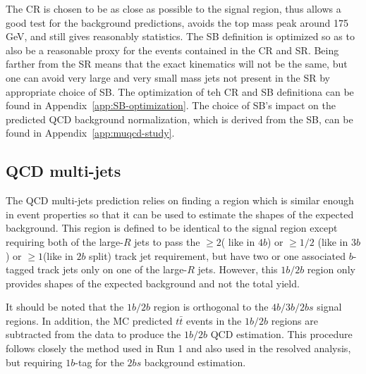 The CR is chosen to be as close as possible to the signal region, thus allows a good test for the background predictions, avoids the top mass peak around 175 GeV, and still gives reasonably statistics.  The SB definition is optimized so as to also be a reasonable proxy for the events contained in the CR and SR. Being farther from the SR means that the exact kinematics will not be the same, but one can avoid very large and very small mass jets not present in the SR by appropriate choice of SB.   The optimization of teh CR and SB definitiona can be found in Appendix~\ref{app:SB-optimization}. The choice of SB's impact on the predicted QCD background normalization, which is derived from the SB, can be found in Appendix~\ref{app:muqcd-study}.


\pagebreak{}
\subsection{QCD multi-jets}
\label{sec:boosted-qcd}

The QCD multi-jets prediction relies on finding a region which is similar enough in event properties so that it can be used to estimate the shapes of the expected background. This region is defined to be identical to the signal region except requiring both of the large-$R$ jets to pass the $\geq 2$( like in $4b$) or $\geq 1/2$ (like in $3b$) or $\geq 1$(like in $2b$ split) track jet requirement, but have two or one associated $b$-tagged track jets only on one of the large-$R$ jets. However, this $1b/2b$ region only provides shapes of the expected background and not the total yield. 

It should be noted that the $1b/2b$ region is orthogonal to the $4b/3b/2bs$ signal regions. In addition, the MC predicted $t\bar{t}$ events in the $1b/2b$ regions are subtracted from the data to produce the $1b/2b$ QCD estimation. This procedure follows closely the method used in Run 1 and also used in the resolved analysis, but requiring $1b$-tag for the $2bs$ background estimation.

